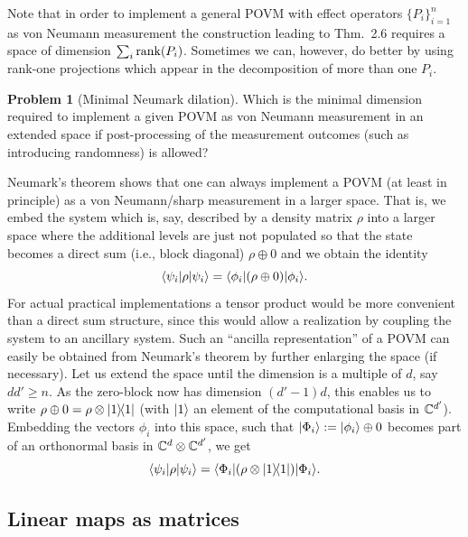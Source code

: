 \documentclass[11pt,a4paper]{article}
\numberwithin{equation}{section}
\theoremstyle{plain}
\theoremstyle{definition}
\newtheorem{problem}{Problem} %
\begin{document}
Note that in order to implement a general POVM with effect operators $\{P_i\}_{i=1}^n$
as von Neumann measurement the construction leading to Thm.~2.6 requires a space of
dimension $\sum_i \operatorname{rank}(P_i)$. Sometimes we can, however, do better by using rank-one
projections which appear in the decomposition of more than one $P_i$.

\begin{problem}[Minimal Neumark dilation]
Which is the minimal dimension required to implement a given POVM as von Neumann
measurement in an extended space if post-processing of the measurement outcomes
(such as introducing randomness) is allowed?
\end{problem}

Neumark's theorem shows that one can always implement a POVM (at least in
principle) as a von Neumann/sharp measurement in a larger space. That is, we embed
the system which is, say, described by a density matrix $\rho$ into a larger space
where the additional levels are just not populated so that the state becomes a
direct sum (i.e., block diagonal) $\rho \oplus 0$ and we obtain the identity
\begin{equation}\label{eq:2.16}
    \langle\psi_i|\rho|\psi_i\rangle = \langle\phi_i|(\rho \oplus 0)|\phi_i\rangle.
\end{equation}
For actual practical implementations a tensor product would be more convenient than
a direct sum structure, since this would allow a realization by coupling the system
to an ancillary system. Such an ``ancilla representation'' of a POVM can easily be
obtained from Neumark's theorem by further enlarging the space (if necessary). Let
us extend the space until the dimension is a multiple of $d$, say $dd' \ge n$. As the
zero-block now has dimension $(d'-1)d$, this enables us to write
$\rho\oplus 0 = \rho \otimes |1\rangle\!\langle1|$ (with $|1\rangle$ an element of the
computational basis in $\mathbb{C}^{d'}$). Embedding the vectors $\phi_i$ into this space,
such that $|\Phi_i\rangle:=|\phi_i\rangle\oplus 0$ becomes part of an orthonormal basis in
$\mathbb{C}^d\otimes \mathbb{C}^{d'}$, we get
\begin{equation}\label{eq:2.17}
    \langle\psi_i|\rho|\psi_i\rangle = \langle\Phi_i|(\rho\otimes |1\rangle\!\langle1|)|\Phi_i\rangle.
\end{equation}

\subsection{Linear maps as matrices}
\end{document}
